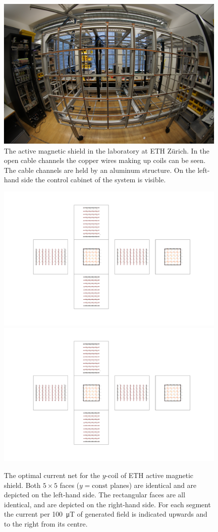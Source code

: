 \begin{figure}
  \centering
  \includegraphics[width=0.75\linewidth]{gfx/prototype/DSC03472.JPG}
  \caption{The active magnetic shield in the laboratory at ETH Zürich. In the open cable channels the copper wires making up coils can be seen. The cable channels are held by an aluminum structure. On the left-hand side the control cabinet of the system is visible.}\label{fig:prototype_photo}
\end{figure}

\begin{figure}
  \centering
  \includegraphics[height=0.3\linewidth]{gfx/prototype/coil_design_y_100uT_1.pdf}
  \quad\quad
  \includegraphics[height=0.3\linewidth]{gfx/prototype/coil_design_y_100uT_2.pdf}
  \caption{The optimal current net for the $y$-coil of ETH active magnetic shield. Both $5 \times 5$ faces ($y = \mathrm{const}$ planes) are identical and are depicted on the left-hand side. The rectangular faces are all identical, and are depicted on the right-hand side. For each segment the current per \SI{100}{\micro\tesla} of generated field is indicated upwards and to the right from its centre.}\label{fig:prototype_coil_y_currents}
\end{figure}

